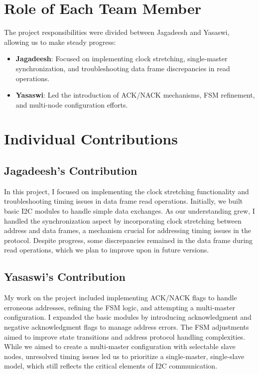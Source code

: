 \documentclass[a4paper,12pt]{report}
\begin{document}
\section{Role of Each Team Member}
The project responsibilities were divided between Jagadeesh and Yasaswi, allowing us to make steady progress:
\begin{itemize}
    \item \textbf{Jagadeesh}: Focused on implementing clock stretching, single-master synchronization, and troubleshooting data frame discrepancies in read operations.
    \item \textbf{Yasaswi}: Led the introduction of ACK/NACK mechanisms, FSM refinement, and multi-node configuration efforts.
\end{itemize}
\section{Individual Contributions}

\subsection*{Jagadeesh’s Contribution}
In this project, I focused on implementing the clock stretching functionality and troubleshooting timing issues in data frame read operations. Initially, we built basic I2C modules to handle simple data exchanges. As our understanding grew, I handled the synchronization aspect by incorporating clock stretching between address and data frames, a mechanism crucial for addressing timing issues in the protocol. Despite progress, some discrepancies remained in the data frame during read operations, which we plan to improve upon in future versions.

\subsection*{Yasaswi’s Contribution}
My work on the project included implementing ACK/NACK flags to handle erroneous addresses, refining the FSM logic, and attempting a multi-master configuration. I expanded the basic modules by introducing acknowledgment and negative acknowledgment flags to manage address errors. The FSM adjustments aimed to improve state transitions and address protocol handling complexities. While we aimed to create a multi-master configuration with selectable slave nodes, unresolved timing issues led us to prioritize a single-master, single-slave model, which still reflects the critical elements of I2C communication.
\newpage
\end{document}
